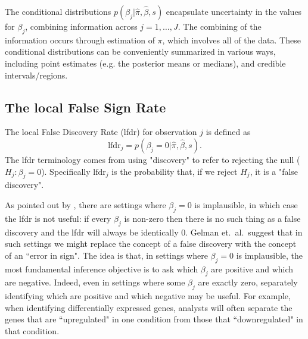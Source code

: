 \documentclass[11pt]{article}
\def\lfdr{\text{lfdr}}
\def\bhat{\hat{\beta}}
\begin{document}

The conditional distributions $p(\beta_j | \hat\pi, \bhat, s)$ 
encapsulate uncertainty in the values for $\beta_j$, combining information across
$j=1,\dots,J$. The combining of the information occurs through estimation of
$\pi$, which involves all of the data.
These conditional distributions can be conveniently summarized
in various ways, including point estimates (e.g. the posterior means or medians),
and credible intervals/regions.



\subsection*{The local False Sign Rate}

The local False Discovery Rate (lfdr) for observation $j$ is defined \cite{efron2001empirical} as
\begin{equation}
\lfdr_j = p(\beta_j = 0 | \hat\pi, \bhat, s).
\end{equation}
The lfdr terminology comes from using "discovery" to refer to rejecting the null ($H_j:\beta_j=0$).
Specifically $\lfdr_j$ is the probability that, if we reject $H_j$,
it is a  "false discovery".  

As pointed out by \cite{gelman2012we}, there are settings where
$\beta_j=0$ is implausible, in which case the lfdr is not useful: if every $\beta_j$ is non-zero then there
is no such thing as a false discovery and the lfdr will always be identically 0. 
Gelman et.~al.~suggest that in such settings we
might replace the concept of a false discovery with the
concept of an ``error in sign". The idea is that, in settings where $\beta_j=0$ is implausible, the most fundamental
inference objective is to ask which $\beta_j$ are positive and which are negative. Indeed, even in settings where some
$\beta_j$ are exactly zero, separately identifying which are positive and which negative may be useful. For example, when identifying differentially expressed genes,
analysts will often separate the genes that are ``upregulated" in one condition from those that ``downregulated" in that condition.
\end{document}
